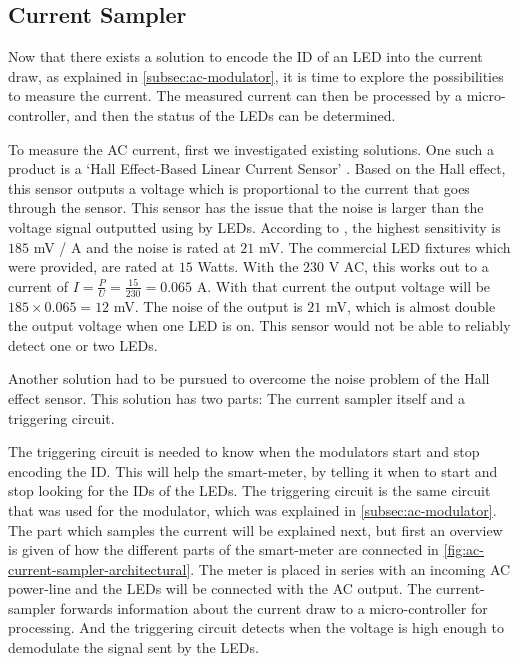 

\subsection{Current Sampler}
\label{subsec:ac-current-sampler}


Now that there exists a solution to encode the ID of an LED into the current draw, as explained in \autoref{subsec:ac-modulator}, it is time to explore the possibilities to measure the current.
The measured current can then be processed by a micro-controller, and then the status of the LEDs can be determined.


To measure the AC current, first we investigated existing solutions.
One such a product is a `Hall Effect-Based Linear Current Sensor' \cite{hall-ac-current-sensor-datasheet}.
Based on the Hall effect, this sensor outputs a voltage which is proportional to the current that goes through the sensor.
This sensor has the issue that the noise is larger than the voltage signal outputted using by LEDs.
According to \cite{hall-ac-current-sensor-datasheet}, the highest sensitivity is $185$ mV / A and the noise is rated at $21$ mV.
The commercial LED fixtures which were provided, are rated at $15$ Watts.
With the 230 V AC, this works out to a current of $I = \frac{P}{U} = \frac{15}{230} = 0.065$ A.
With that current the output voltage will be $185 \times 0.065 = 12$ mV.
The noise of the output is $21$ mV, which is almost double the output voltage when one LED is on.
This sensor would not be able to reliably detect one or two LEDs.



Another solution had to be pursued to overcome the noise problem of the Hall effect sensor.
This solution has two parts: The current sampler itself and a triggering circuit.

The triggering circuit is needed to know when the modulators start and stop encoding the ID.
This will help the smart-meter, by telling it when to start and stop looking for the IDs of the LEDs.
The triggering circuit is the same circuit that was used for the modulator, which was explained in \autoref{subsec:ac-modulator}.
The part which samples the current will be explained next, but first an overview is given of how the different parts of the smart-meter are connected in \autoref{fig:ac-current-sampler-architectural}.
The meter is placed in series with an incoming AC power-line and the LEDs will be connected with the AC output.
The current-sampler forwards information about the current draw to a micro-controller for processing.
And the triggering circuit detects when the voltage is high enough to demodulate the signal sent by the LEDs.


